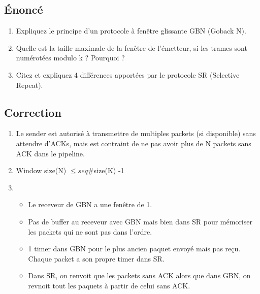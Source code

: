 \documentclass[a4paper, 11pt, titlepage]{article}
\begin{document}
\subsection{\'Enoncé}
\begin{enumerate}[label=(\alph*)]
\item Expliquez le principe d’un protocole à fenêtre glissante GBN (Goback N).
\item Quelle est la taille maximale de la fenêtre de l’émetteur, si les trames sont numérotées modulo k ? Pourquoi ?
\item Citez et expliquez 4 différences apportées par le protocole SR (Selective Repeat).
\end{enumerate}

\subsection{Correction}
\begin{enumerate}[label=(\alph*)]
\item
Le sender est autorisé à transmettre de multiples packets (si disponible) sans attendre d'ACKs, mais est contraint de ne pas avoir plus de N packets sans ACK dans le pipeline.

\item 
Window size(N) $\leq seq\# $size(K) -1 

\item  
\begin{itemize}
\item Le receveur de GBN a une fenêtre de 1.
\item Pas de buffer au receveur avec GBN mais bien dans SR pour mémoriser les packets qui ne sont pas dans l'ordre.
\item 1 timer dans GBN pour le plus ancien paquet envoyé mais pas reçu. Chaque packet a son propre timer dans SR.
\item Dans SR, on renvoit que les packets sans ACK alors que dans GBN, on revnoit tout les paquets à partir de celui sans ACK.
\end{itemize}

\end{enumerate}
\end{document}
